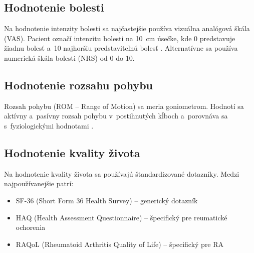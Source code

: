 \subsection{Hodnotenie bolesti}

Na hodnotenie intenzity bolesti sa najčastejšie používa vizuálna analógová škála (VAS). Pacient označí intenzitu bolesti na 10~cm úsečke, kde 0 predstavuje žiadnu bolesť a~10 najhoršiu predstaviteľnú bolesť \parencite{Herbert2022}. Alternatívne sa používa numerická škála bolesti (NRS) od 0 do 10.

\subsection{Hodnotenie rozsahu pohybu}

Rozsah pohybu (ROM -- Range of Motion) sa meria goniometrom. Hodnotí sa aktívny a~pasívny rozsah pohybu v~postihnutých kĺboch a~porovnáva sa s~fyziologickými hodnotami \parencite{Kolar2012}.

\subsection{Hodnotenie kvality života}

Na hodnotenie kvality života sa používajú štandardizované dotazníky. Medzi najpoužívanejšie patrí:
\begin{itemize}
    \item SF-36 (Short Form 36 Health Survey) -- generický dotazník
    \item HAQ (Health Assessment Questionnaire) -- špecifický pre reumatické ochorenia
    \item RAQoL (Rheumatoid Arthritis Quality of Life) -- špecifický pre RA \parencite{Krchnava2018}
\end{itemize}

\clearpage
